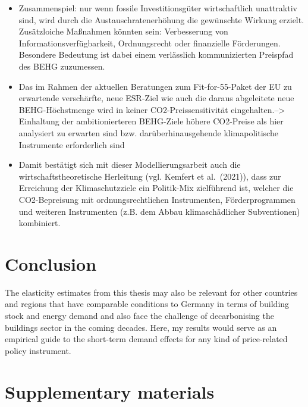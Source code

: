 \documentclass[12pt,twoside]{reedthesis}
\begin{document}
\begin{itemize}
\item
  Zusammenspiel: nur wenn fossile Investitionsgüter wirtschaftlich unattraktiv sind, wird durch die Austauschratenerhöhung die gewünschte Wirkung erzielt. Zusätzloiche Maßnahmen könnten sein: Verbesserung von Informationsverfügbarkeit, Ordnungsrecht oder finanzielle Förderungen. Besondere Bedeutung ist dabei einem verlässlich kommunizierten Preispfad des BEHG zuzumessen.
\item
  Das im Rahmen der aktuellen Beratungen zum Fit-for-55-Paket der EU zu erwartende verschärfte, neue ESR-Ziel wie auch die daraus abgeleitete neue BEHG-Höchstmenge wird in keiner CO2-Preissensitivität eingehalten.--\textgreater{} Einhaltung der ambitionierteren BEHG-Ziele höhere CO2-Preise als hier analysiert zu erwarten sind bzw. darüberhinausgehende klimapolitische Instrumente erforderlich sind
\item
  Damit bestätigt sich mit dieser Modellierungsarbeit auch die wirtschaftstheoretische Herleitung (vgl. Kemfert et al.~(2021)), dass zur Erreichung der Klimaschutzziele ein Politik-Mix zielführend ist, welcher die CO2-Bepreisung mit ordnungsrechtlichen Instrumenten, Förderprogrammen und weiteren Instrumenten (z.B. dem Abbau klimaschädlicher Subventionen) kombiniert.
\end{itemize}
\hypertarget{conclusion}{%
\chapter{Conclusion}\label{conclusion}}

The elasticity estimates from this thesis may also be relevant for other countries and regions that have comparable conditions to Germany in terms of building stock and energy demand and also face the challenge of decarbonising the buildings sector in the coming decades. Here, my results would serve as an empirical guide to the short-term demand effects for any kind of price-related policy instrument.

\appendix

\hypertarget{supplementary-materials}{%
\chapter{Supplementary materials}\label{supplementary-materials}}
\end{document}
